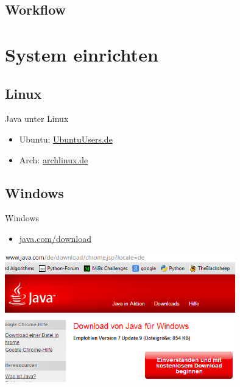 \documentclass[usepdftitle=false,hyperref={pdfpagelabels=false}]{beamer}
\begin{document}
\subsection{Workflow}

\section{System einrichten}
\subsection{Linux}
\begin{frame}{Java unter Linux}
    \begin{itemize}
        \item Ubuntu: \href{http://wiki.ubuntuusers.de/Java/Installation}{UbuntuUsers.de}\\
        \item Arch: \href{https://wiki.archlinux.de/title/Java}{archlinux.de}\\
    \end{itemize}
\end{frame}

\subsection{Windows}
\begin{frame}{Windows}
    \begin{itemize}
        \item \href{http://java.com/de/download/index.jsp}{java.com/download}
    \end{itemize}
    \includegraphics[width=100mm]{java-download.png}
\end{frame}
\end{document}
